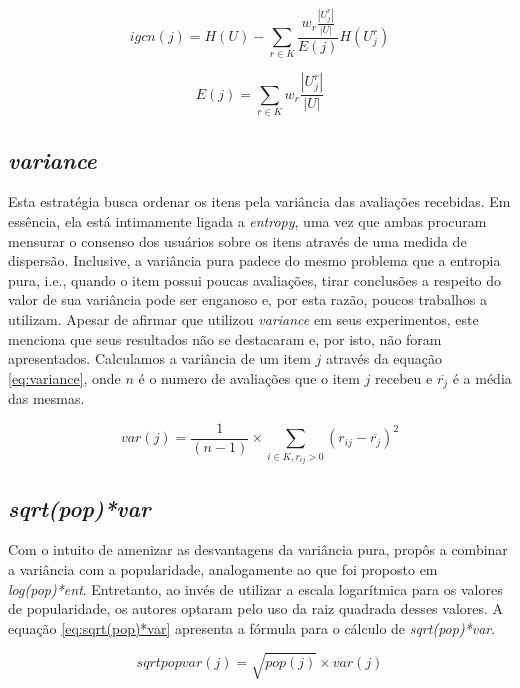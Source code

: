 \begin{equation}
igcn(j) = H(U) - \sum_{r \in K} \frac{w_r \frac{|U_{j}^{r}|}{|U|}}{E(j)} H(U_{j}^{r})
\label{eq:igcn}
\end{equation}

\begin{equation}
E(j) = \sum_{r \in K} w_r \frac{|U_{j}^{r}|}{|U|}
\end{equation}

\subsection{\textit{variance}}
Esta estratégia busca ordenar os itens pela variância das avaliações recebidas. Em essência, ela está intimamente ligada a \textit{entropy}, uma vez que ambas procuram mensurar o consenso dos usuários sobre os itens através de uma medida de dispersão. Inclusive, a variância pura padece do mesmo problema que a entropia pura, i.e., quando o item possui poucas avaliações, tirar conclusões a respeito do valor de sua variância pode ser enganoso e, por esta razão, poucos trabalhos a utilizam. Apesar de \citep{Elahi:2014:ALS:2542182.2542195} afirmar que utilizou \textit{variance} em seus experimentos, este menciona que seus resultados não se destacaram e, por isto, não foram apresentados. Calculamos a variância de um item $j$ através da equação \ref{eq:variance}, onde $n$ é o numero de avaliações que o item $j$ recebeu e $\overline{r_{j}}$ é a média das mesmas.

\begin{equation}
var(j) = \frac{1}{(n-1)} \times \sum_{i \in K, r_{ij} > 0} (r_{ij} - \overline{r_{j}})^2
\label{eq:variance}
\end{equation}

\subsection{\textit{sqrt(pop)*var}}
Com o intuito de amenizar as desvantagens da variância pura, \citep{Golbandi:2010:BRS:1871437.1871734} propôs a combinar a variância com a popularidade, analogamente ao que foi proposto em \textit{log(pop)*ent}. Entretanto, ao invés de utilizar a escala logarítmica para os valores de popularidade, os autores optaram pelo uso da raiz quadrada desses valores. A equação \ref{eq:sqrt(pop)*var} apresenta a fórmula para o cálculo de \textit{sqrt(pop)*var}. 

\begin{equation}
sqrtpopvar(j) = \sqrt{pop(j)} \times var(j)
\label{eq:sqrt(pop)*var}
\end{equation}

